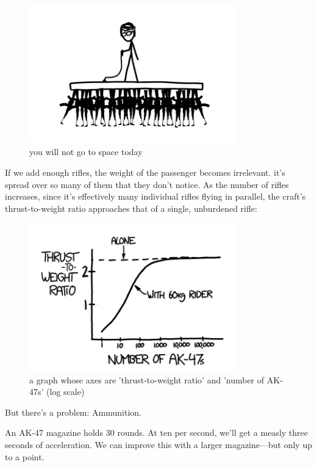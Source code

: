 \begin{figure}[!htbp]
\centering
\includegraphics[scale=0.5, max width=0.8\textwidth]{imgs/a/21/jetpack_500.png}
\caption{you will not go to space today}
\end{figure}

{If we add enough rifles, the weight of the passenger becomes irrelevant. it’s spread over so many of them that they don’t notice. As the number of rifles increases, since it’s effectively many individual rifles flying in parallel, the craft’s thrust-to-weight ratio approaches that of a single, unburdened rifle:}

\begin{figure}[!htbp]
\centering
\includegraphics[scale=0.5, max width=0.8\textwidth]{imgs/a/21/jetpack_twr.png}
\caption{a graph whose axes are 'thrust-to-weight ratio' and 'number of AK-47s' (log scale)}
\end{figure}

{But there’s a problem: Ammunition.}

{An AK-47 magazine holds 30 rounds. At ten per second, we’ll get a measly three seconds of acceleration. We can improve this with a larger magazine—but only up to a point.}

